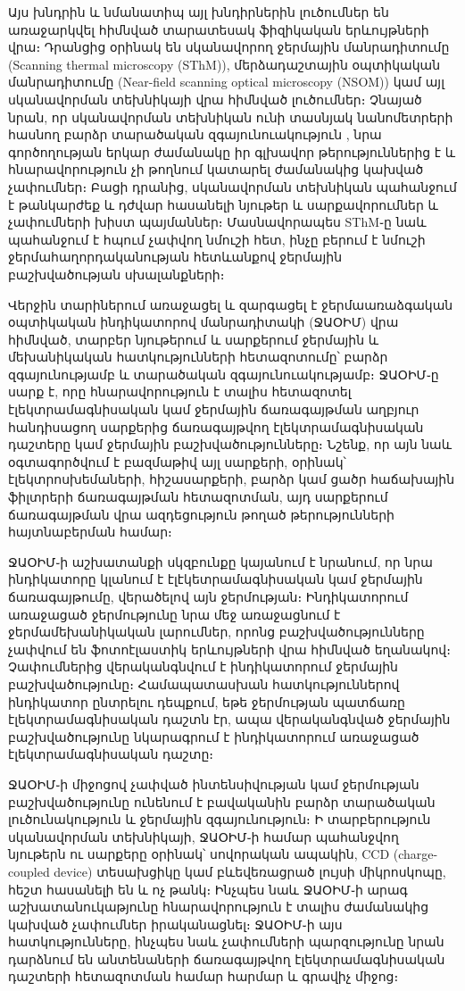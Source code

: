 \documentclass[12pt, fleqn]{report}
\begin{document}
Այս խնդրին և նմանատիպ այլ խնդիրներին լուծումներ են առաջարկվել հիմնված տարատեսակ ֆիզիկական երևույթների վրա։ Դրանցից օրինակ են սկանավորող ջերմային մանրադիտումը (Scanning thermal microscopy (SThM)), մերձադաշտային օպտիկական մանրադիտումը (Near-field scanning optical microscopy (NSOM)) կամ այլ սկանավորման տեխնիկայի վրա հիմնված լուծումներ։ Չնայած նրան, որ սկանավորման տեխնիկան ունի տասնյակ նանոմետրերի հասնող բարձր տարածական զգայունուակություն \cite{yue2012nanoscalethermal}, նրա գործողության երկար ժամանակը իր գլխավոր թերություններից է և հնարավորություն չի թողնում կատարել ժամանակից կախված չափումներ։ Բացի դրանից, սկանավորման տեխնիկան պահանջում է թանկարժեք և դժվար հասանելի նյութեր և սարքավորումներ և չափումների խիստ պայմաններ։ Մասնավորապես SThM֊ը նաև պահանջում է հպում չափվող նմուշի հետ, ինչը բերում է նմուշի ջերմահաղորդականության հետևանքով ջերմային բաշխվածության սխալանքների։

Վերջին տարիներում առաջացել և զարգացել է ջերմաառաձգական օպտիկական ինդիկատորով մանրադիտակի (ՋԱՕԻՄ) վրա հիմնված, տարբեր նյութերում և սարքերում ջերմային և մեխանիկական հատկությունների հետազոտումը՝  բարձր զգայունությամբ և տարածական զգայունուակությամբ։ ՋԱՕԻՄ֊ը սարք է, որը հնարավորություն է տալիս հետազոտել էլեկտրամագնիսական կամ ջերմային ճառագայթման աղբյուր հանդիսացող սարքերից ճառագայթվող էլեկտրամագնիսական դաշտերը կամ ջերմային բաշխվածությունները։ Նշենք, որ այն նաև օգտագործվում է բազմաթիվ այլ սարքերի, օրինակ՝ էլեկտրոսխեմաների, հիշասարքերի, բարձր կամ ցածր հաճախային ֆիլտրերի ճառագայթման հետազոտման, այդ սարքերում  ճառագայթման վրա ազդեցություն թողած թերությունների հայտնաբերման համար։

ՋԱՕԻՄ֊ի աշխատանքի սկզբունքը կայանում է նրանում, որ նրա ինդիկատորը կլանում է էլէկետրամագնիսական կամ ջերմային ճառագայթումը, վերածելով այն ջերմության։ Ինդիկատորում առաջացած ջերմությունը նրա մեջ առաջացնում է ջերմամեխանիկական լարումներ, որոնց բաշխվածությունները չափվում են ֆոտոէլաստիկ երևույթների վրա հիմնված եղանակով։ Չափումներից վերականգնվում է ինդիկատորում ջերմային բաշխվածությունը։ Համապատասխան հատկություններով ինդիկատոր ընտրելու դեպքում, եթե ջերմության պատճառը էլեկտրամագնիսական դաշտն էր, ապա վերականգնված ջերմային բաշխվածությունը նկարագրում է ինդիկատորում առաջացած էլեկտրամագնիսական դաշտը։

ՋԱՕԻՄ֊ի միջոցով չափված ինտենսիվության կամ ջերմության բաշխվածությունը ունենում է բավականին բարձր տարածական լուծունակություն և ջերմային զգայունություն։ Ի տարբերություն սկանավորման տեխնիկայի, ՋԱՕԻՄ֊ի համար պահանջվող նյութերն ու սարքերը օրինակ՝ սովորական ապակին, CCD (charge-coupled device) տեսախցիկը կամ բևեվեռացրած լույսի միկրոսկոպը, հեշտ հասանելի են և ոչ թանկ։ Ինչպես նաև ՋԱՕԻՄ֊ի արագ աշխատանուկաթյունը հնարավորություն է տալիս ժամանակից կախված չափումներ իրականացնել։ ՋԱՕԻՄ֊ի այս հատկությունները, ինչպես նաև չափումների պարզությունը նրան դարձնում են անտենաների ճառագայթվող էլեկտրամագնիսական դաշտերի հետազոտման համար հարմար և գրավիչ միջոց։
\end{document}
